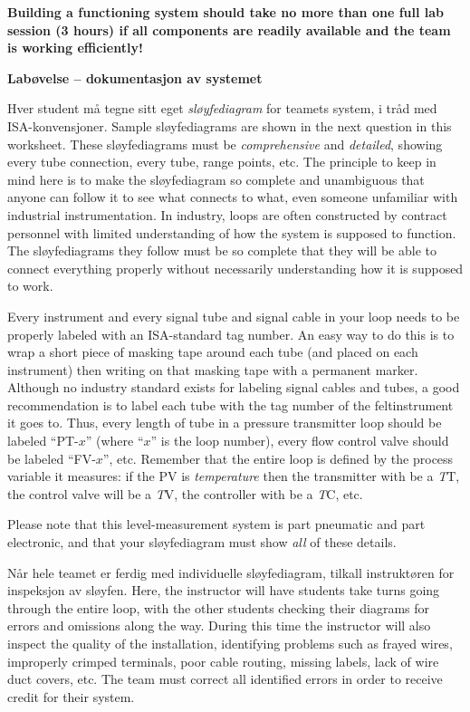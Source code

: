 \vskip 10pt

{\bf Building a functioning system should take no more than one full lab session (3 hours) if all components are readily available and the team is working efficiently!}





\vfil \eject

\noindent
{\bf Labøvelse -- dokumentasjon av systemet}

\vskip 5pt

Hver student må tegne sitt eget {\it sløyfediagram} for teamets system, i tråd med ISA-konvensjoner.  Sample sløyfediagrams are shown in the next question in this worksheet.  These sløyfediagrams must be {\it comprehensive} and {\it detailed}, showing every tube connection, every tube, range points, etc.  The principle to keep in mind here is to make the sløyfediagram so complete and unambiguous that anyone can follow it to see what connects to what, even someone unfamiliar with industrial instrumentation.  In industry, loops are often constructed by contract personnel with limited understanding of how the system is supposed to function.  The sløyfediagrams they follow must be so complete that they will be able to connect everything properly without necessarily understanding how it is supposed to work.

Every instrument and every signal tube and signal cable in your loop needs to be properly labeled with an ISA-standard tag number.  An easy way to do this is to wrap a short piece of masking tape around each tube (and placed on each instrument) then writing on that masking tape with a permanent marker.  Although no industry standard exists for labeling signal cables and tubes, a good recommendation is to label each tube with the tag number of the feltinstrument it goes to.  Thus, every length of tube in a pressure transmitter loop should be labeled ``PT-$x$'' (where ``$x$'' is the loop number), every flow control valve should be labeled ``FV-$x$'', etc.  Remember that the entire loop is defined by the process variable it measures: if the PV is {\it temperature} then the transmitter with be a {\it T}T, the control valve will be a {\it T}V, the controller with be a {\it T}C, etc.

Please note that this level-measurement system is part pneumatic and part electronic, and that your sløyfediagram must show {\it all} of these details.

Når hele teamet er ferdig med individuelle sløyfediagram, tilkall instruktøren for inspeksjon av sløyfen.  Here, the instructor will have students take turns going through the entire loop, with the other students checking their diagrams for errors and omissions along the way.  During this time the instructor will also inspect the quality of the installation, identifying problems such as frayed wires, improperly crimped terminals, poor cable routing, missing labels, lack of wire duct covers, etc.  The team must correct all identified errors in order to receive credit for their system.  

